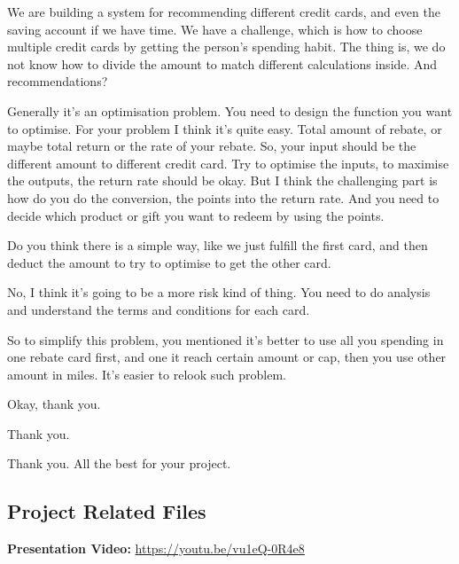 \begin{description}[leftmargin=4em,style=nextline]
	\item[JH:] We are building a system for recommending different credit cards, and even the saving account if we have time. We have a challenge, which is how to choose multiple credit cards by getting the person’s spending habit. The thing is, we do not know how to divide the amount to match different calculations inside. And recommendations?

	\item[HJ:] Generally it’s an optimisation problem. You need to design the function you want to optimise. For your problem I think it’s quite easy. Total amount of rebate, or maybe total return or the rate of your rebate. So, your input should be the different amount to different credit card.  Try to optimise the inputs, to maximise the outputs, the return rate should be okay. But I think the challenging part is how do you do the conversion, the points into the return rate. And you need to decide which product or gift you want to redeem by using the points.

	\item[JH:] Do you think there is a simple way, like we just fulfill the first card, and then deduct the amount to try to optimise to get the other card.

	\item[HJ:] No, I think it’s going to be a more risk kind of thing. You need to do analysis and understand the terms and conditions for each card.

	\item[JH:] So to simplify this problem, you mentioned it’s better to use all you spending in one rebate card first, and one it reach certain amount or cap, then you use other amount in miles. It’s easier to relook such problem.

	\item[JH:] Okay, thank you.

	\item[LD:] Thank you.

	\item[HJ:] Thank you. All the best for your project.

\end{description}

\clearpage{}

\subsection{Project Related Files} %
\label{sub:project_related_files}
	\textbf{Presentation Video:} \url{https://youtu.be/vu1eQ-0R4e8}

